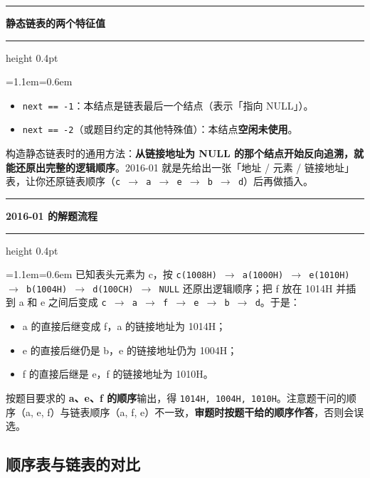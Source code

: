 \documentclass[11pt,openany,UTF8]{ctexbook}
\newcommand{\callouthead}[2]{%
  \par\addvspace{7pt}\noindent
  {\color{#1}\rule[-0.15em]{3pt}{1.05em}}\hspace{0.5em}%
  {\bfseries\color{#1}#2}\par\nobreak\vspace{-0.35em}%
  {\color{rulesep}\hrule height 0.4pt}\nobreak\vspace{0.45em}%
  \begingroup\small\setlength{\parindent}{0pt}%
  \leftskip=1.1em\rightskip=0.6em\noindent\ignorespaces}
\newcommand{\calloutend}{\par\endgroup\addvspace{7pt}}
\newenvironment{callkey}[1]{\callouthead{keybar}{#1}}{\calloutend}
\newenvironment{callexam}[1]{\callouthead{exambar}{#1}}{\calloutend}
\begin{document}
\begin{callkey}{静态链表的两个特征值}
\begin{itemize}
\item \texttt{next =\allowbreak{}=\allowbreak{} -1}：本结点是链表最后一个结点（表示「指向 NULL」）。
\item \texttt{next =\allowbreak{}=\allowbreak{} -2}（或题目约定的其他特殊值）：本结点\textbf{空闲未使用}。
\end{itemize}
构造静态链表时的通用方法：\textbf{从链接地址为 NULL 的那个结点开始反向追溯，就能还原出完整的逻辑顺序}。2016-01 就是先给出一张「地址 / 元素 / 链接地址」表，让你还原链表顺序（\texttt{c $\to$ a $\to$ e $\to$ b $\to$ d}）后再做插入。

\end{callkey}

\begin{callexam}{2016-01 的解题流程}
已知表头元素为 c，按 \texttt{c(1008H)\allowbreak{} $\to$ a(1000H)\allowbreak{} $\to$ e(1010H)\allowbreak{} $\to$ b(1004H)\allowbreak{} $\to$ d(100CH)\allowbreak{} $\to$ NULL} 还原出逻辑顺序；把 f 放在 1014H 并插到 a 和 e 之间后变成 \texttt{c $\to$ a $\to$ f $\to$ e $\to$ b $\to$ d}。于是：

\begin{itemize}
\item a 的直接后继变成 f，a 的链接地址为 1014H；
\item e 的直接后继仍是 b，e 的链接地址仍为 1004H；
\item f 的直接后继是 e，f 的链接地址为 1010H。
\end{itemize}
按题目要求的 \textbf{a、e、f 的顺序}输出，得 \texttt{1014H,\allowbreak{} 1004H,\allowbreak{} 1010H}。注意题干问的顺序（a, e, f）与链表顺序（a, f, e）不一致，\textbf{审题时按题干给的顺序作答}，否则会误选。

\end{callexam}

\subsection{顺序表与链表的对比}
\end{document}
